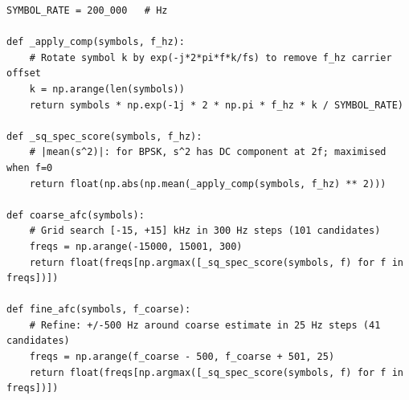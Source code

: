 \documentclass[journal]{IEEEtran}
\begin{document}
\begin{lstlisting}[caption={Coarse + fine automatic frequency correction using
the squared-spectrum BPSK estimator.}, label={lst:afc}]
SYMBOL_RATE = 200_000   # Hz

def _apply_comp(symbols, f_hz):
    # Rotate symbol k by exp(-j*2*pi*f*k/fs) to remove f_hz carrier offset
    k = np.arange(len(symbols))
    return symbols * np.exp(-1j * 2 * np.pi * f_hz * k / SYMBOL_RATE)

def _sq_spec_score(symbols, f_hz):
    # |mean(s^2)|: for BPSK, s^2 has DC component at 2f; maximised when f=0
    return float(np.abs(np.mean(_apply_comp(symbols, f_hz) ** 2)))

def coarse_afc(symbols):
    # Grid search [-15, +15] kHz in 300 Hz steps (101 candidates)
    freqs = np.arange(-15000, 15001, 300)
    return float(freqs[np.argmax([_sq_spec_score(symbols, f) for f in freqs])])

def fine_afc(symbols, f_coarse):
    # Refine: +/-500 Hz around coarse estimate in 25 Hz steps (41 candidates)
    freqs = np.arange(f_coarse - 500, f_coarse + 501, 25)
    return float(freqs[np.argmax([_sq_spec_score(symbols, f) for f in freqs])])
\end{lstlisting}



\end{document}
